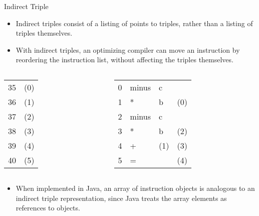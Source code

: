 \begin{bibunit}[apalike]
\begin{frame}{Indirect Triple}
	\begin{small}
	\begin{itemize}
	\item Indirect triples consist of a listing of points to triples, rather than a listing of triples themselves.
	\item With indirect triples, an optimizing compiler can move an instruction by reordering the instruction list, without affecting the triples themselves.
	\end{itemize}
	\begin{columns}
		\begin{column}{.5\linewidth}
			\begin{center}
			\begin{tabular}{|c|c|}
			\hline
			35 & (0) \\
			36 & (1) \\
			37 & (2) \\
			38 & (3) \\
			39 & (4) \\
			40 & (5) \\
			\hline
			\end{tabular}
			\end{center}
		\end{column}
		\begin{column}{.5\linewidth}
			\begin{tabularx}{\linewidth}{|c|X|X|X|}
			\hline
			\tabularheading&\chead{op}&\chead{arg$_1$}&\chead{arg$_2$}\\
			\hline
			0 & minus & c & \\
			\hline
			1 & * & b & (0) \\
			\hline
			2 & minus & c & \\
			\hline
			3 & * & b & (2) \\
			\hline
			4 & + & (1) & (3) \\
			\hline
			5 & = & \tactext{a} & (4) \\
			\hline
			\end{tabularx}
		\end{column}
	\end{columns}
	\begin{itemize}
	\item When implemented in Java, an array of instruction objects is analogous to an indirect triple representation, since Java treats the array elements as references to objects.
	\end{itemize}
	\end{small}
\end{frame}


\end{bibunit}
